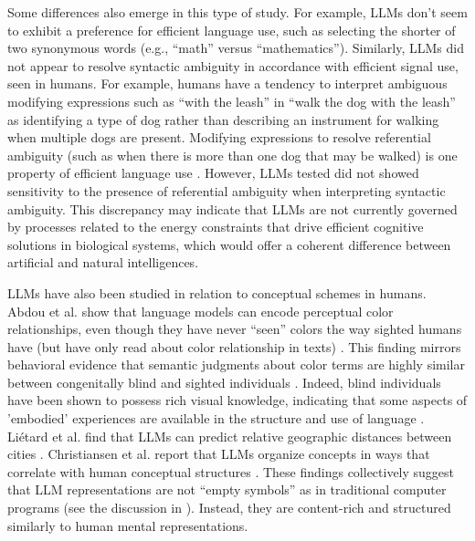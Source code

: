 Some differences also emerge in this type of study.  For example, LLMs don't
seem to exhibit a preference for efficient language use, such as selecting the
shorter of two synonymous words (e.g., ``math'' versus ``mathematics'').
Similarly,  LLMs did not appear to resolve syntactic ambiguity in accordance
with efficient signal use, seen in humans. For example, humans have a tendency
to interpret ambiguous modifying expressions such as ``with the leash'' in
``walk the dog with the leash'' as identifying a type of dog rather than
describing an instrument for walking when multiple dogs are present. Modifying
expressions to resolve referential ambiguity (such as when there is more than
one dog that may be walked) is one property of efficient language use
\cite{frank2012predicting}. However, LLMs tested did not showed sensitivity to
the presence of referential ambiguity when interpreting syntactic ambiguity.
This discrepancy may indicate that LLMs are not currently governed by processes
related to the energy constraints that drive efficient cognitive solutions in
biological systems, which would offer a coherent difference between artificial
and natural intelligences.

LLMs have also been studied in relation to conceptual schemes in humans. Abdou
et al. show that language models can encode perceptual color relationships,
even though they have never ``seen'' colors the way sighted humans have (but
have only read about color relationship in texts) \cite{abdou2021can}. This
finding mirrors behavioral evidence that semantic judgments about color terms
are highly similar between congenitally blind and sighted individuals
\cite{marmor1978age, saysani2018colour}. Indeed, blind individuals have been
shown to possess rich visual knowledge, indicating that some aspects of
'embodied' experiences are available in the structure and use of language
\cite{kim2019knowledge, liu2025learning}. Liétard et al. find that LLMs can
predict relative geographic distances between cities \cite{lietard2021do}.
Christiansen et al. report that LLMs organize concepts in ways that correlate
with human conceptual structures \cite{christiansen2023large}. These findings
collectively suggest that LLM representations are not ``empty symbols'' as in
traditional computer programs (see the discussion in
). Instead, they are content-rich and structured
similarly to human mental representations.

